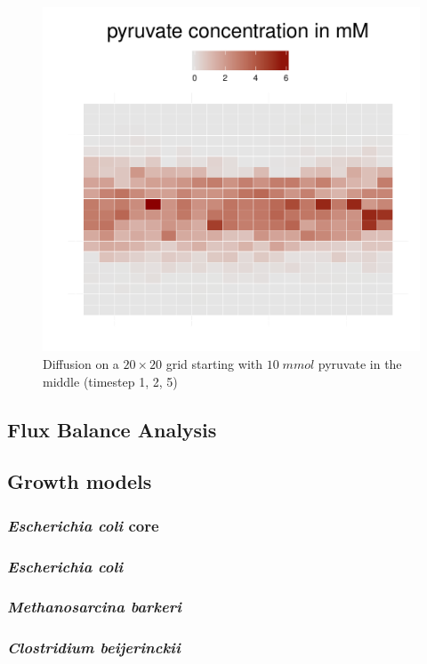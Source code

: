 \begin{figure}[h]
\begin{minipage}[t]{0.3\textwidth}
  \end{minipage}
  \begin{minipage}[t]{0.3\textwidth}
    \includegraphics[width=\textwidth]{diff5.pdf}
  \end{minipage}
  \caption{Diffusion on a $20\times20$ grid starting with $10\; mmol$ pyruvate in the middle (timestep 1, 2, 5)}
\end{figure}
\subsection{Flux Balance Analysis}
\subsection{Growth models}
\subsubsection{\textit{Escherichia coli} core}
\subsubsection{\textit{Escherichia coli}}
\subsubsection{\textit{Methanosarcina barkeri}}
\subsubsection{\textit{Clostridium beijerinckii}}

